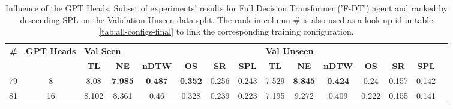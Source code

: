 \begin{table}
\centering
\caption{\label{tab:f_dt_heads}Influence of the GPT Heads. Subset of experiments' results for Full Decision Transformer ('F-DT') agent and ranked by descending SPL on the Validation Unseen data split. The rank in column \# is also used as a look up id in table \ref{tab:all-configs-final} to link the corresponding training configuration.}
\begin{tabular}{@{\hskip3pt}c@{\hskip3pt}c@{\hskip3pt}c@{\hskip3pt}c@{\hskip3pt}c@{\hskip3pt}c@{\hskip3pt}c@{\hskip3pt}c@{\hskip3pt}c@{\hskip3pt}c@{\hskip3pt}c@{\hskip3pt}c@{\hskip3pt}c@{\hskip3pt}c@{\hskip3pt}c}
\toprule
\textbf{\#} & \textbf{GPT Heads} & \multicolumn{6}{l}{\textbf{Val Seen}} & \multicolumn{6}{l}{\textbf{Val Unseen}} \\
 \textbf{~} &         \textbf{~} &       \textbf{TL} &     \textbf{NE} &   \textbf{nDTW} &     \textbf{OS} & \textbf{SR} & \textbf{SPL} &         \textbf{TL} &     \textbf{NE} &   \textbf{nDTW} & \textbf{OS} & \textbf{SR} & \textbf{SPL} \\
\midrule
         79 &                  8 &              8.08 &  \textbf{7.985} &  \textbf{0.487} &  \textbf{0.352} &       0.256 &        0.243 &               7.529 &  \textbf{8.845} &  \textbf{0.424} &        0.24 &       0.157 &        0.142 \\
         81 &                 16 &             8.102 &           8.361 &            0.46 &           0.328 &       0.239 &        0.223 &               7.195 &           9.272 &           0.409 &       0.222 &       0.155 &        0.141 \\
\bottomrule
\end{tabular}
\end{table}
